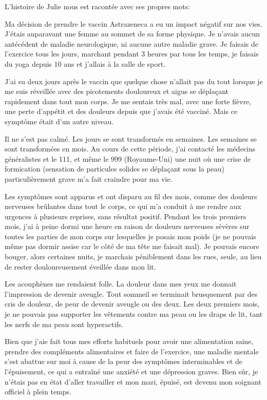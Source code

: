 L'histoire de Julie nous est racontée avec ses propres mots:

Ma décision de prendre le vaccin Astrazeneca a eu un impact négatif sur nos
vies. J'étais auparavant une femme au sommet de sa forme physique. Je n'avais
aucun antécédent de maladie neurologique, ni aucune autre maladie grave. Je
faisais de l'exercice tous les jours, marchant pendant 3 heures par tous les
temps, je faisais du yoga depuis 10 ans et j'allais à la salle de sport.

J'ai su deux jours après le vaccin que quelque chose n'allait pas du tout
lorsque je me suis réveillée avec des picotements douloureux et aigus se
déplaçant rapidement dans tout mon corps. Je me sentais très mal, avec une forte
fièvre, une perte d'appétit et des douleurs depuis que j'avais été vacciné. Mais
ce symptôme était d'un autre niveau.

Il ne s'est pas calmé. Les jours se sont transformés en semaines. Les semaines
se sont transformées en mois. Au cours de cette période, j'ai contacté les
médecins généralistes et le 111, et même le 999 (Royaume-Uni) une nuit où une
crise de formication (sensation de particules solides se déplaçant sous la peau)
particulièrement grave m'a fait craindre pour ma vie.

Les symptômes sont apparus et ont disparu au fil des mois, comme des douleurs
nerveuses brûlantes dans tout le corps, ce qui m'a conduit à me rendre aux
urgences à plusieurs reprises, sans résultat positif. Pendant les trois premiers
mois, j'ai à peine dormi une heure en raison de douleurs nerveuses sévères sur
toutes les parties de mon corps sur lesquelles je posais mon poids (je ne
pouvais même pas dormir assise car le côté de ma tête me faisait mal). Je
pouvais encore bouger, alors certaines nuits, je marchais péniblement dans les
rues, seule, au lieu de rester douloureusement éveillée dans mon lit.

Les acouphènes me rendaient folle. La douleur dans mes yeux me donnait
l'impression de devenir aveugle. Tout sommeil se terminait brusquement par des
cris de douleur, de peur de devenir aveugle ou des deux. Les deux premiers mois,
je ne pouvais pas supporter les vêtements contre ma peau ou les draps de lit,
tant les nerfs de ma peau sont hyperactifs.

Bien que j'aie fait tous mes efforts habituels pour avoir une alimentation
saine, prendre des compléments alimentaires et faire de l'exercice, une maladie
mentale s'est abattue sur moi à cause de la peur des symptômes interminables et
de l'épuisement, ce qui a entraîné une anxiété et une dépression graves. Bien
sûr, je n'étais pas en état d'aller travailler et mon mari, épuisé, est devenu
mon soignant officiel à plein temps.

